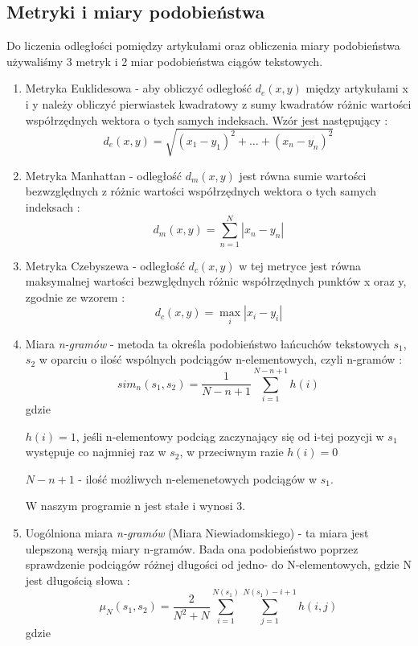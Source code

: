 \documentclass{classrep}
\begin{document}
\subsection{Metryki i miary podobieństwa}
Do liczenia odległości pomiędzy artykułami oraz obliczenia miary podobieństwa używaliśmy 3 metryk i 2 miar podobieństwa ciągów tekstowych.
\begin{enumerate}
\item Metryka Euklidesowa - aby obliczyć odległość $d_e(x,y)$ między artykułami x i y należy obliczyć pierwiastek kwadratowy z sumy kwadratów różnic wartości współrzędnych wektora o tych samych indeksach. Wzór jest następujący \cite{euc}:
\begin{equation} 
d_e(x,y)=\sqrt{(x_1-y_1)^2+\ldots+(x_n-y_n)^2}
\end{equation}
\item Metryka Manhattan - odległość $d_m(x,y)$ jest równa sumie wartości bezwzględnych z różnic wartości współrzędnych wektora o tych samych indeksach \cite{manh}:
\begin{equation} 
d_m(x,y)=\sum_{n=1}^{N} |{x_n-y_n}|
\end{equation}
\item Metryka Czebyszewa - odległość $d_c(x,y)$ w tej metryce jest równa maksymalnej wartości bezwględnych różnic współrzędnych punktów x oraz y, zgodnie ze wzorem \cite{cze}:
\begin{equation} 
d_c(x,y)=\max_{i} |{x_i-y_i}|
\end{equation}
\item Miara \textsl{n-gramów} - metoda ta określa podobieństwo łańcuchów tekstowych $s_1$, $s_2$ w oparciu o ilość wspólnych podciągów n-elementowych, czyli n-gramów \cite{wyklad}:
\begin{equation}
sim_n(s_1, s_2) = \frac{1}{N-n+1} \sum_{i=1}^{N-n+1} h(i)
\end{equation} gdzie 

$h(i) = 1$, jeśli n-elementowy podciąg zaczynający się od i-tej pozycji w $s_1$ występuje co najmniej raz w  $s_2$, w przeciwnym razie $h(i) = 0$

$N-n+1$ - ilość możliwych n-elemenetowych podciągów w $s_1$.

W naszym programie n jest stałe i wynosi 3.
\item Uogólniona miara \textsl{n-gramów} (Miara Niewiadomskiego) - ta miara jest ulepszoną wersją miary n-gramów. Bada ona podobieństwo poprzez sprawdzenie podciągów różnej długości od jedno- do N-elementowych, gdzie N jest długością słowa  \cite{wyklad}:
\begin{equation}
\mu_N(s_1, s_2) = \frac{2}{N^2+N} \sum_{i=1}^{N(s_1)} \sum_{j=1}^{N(s_1)-i+1} h(i,j)
\end{equation} gdzie


\end{enumerate}
\end{document}
